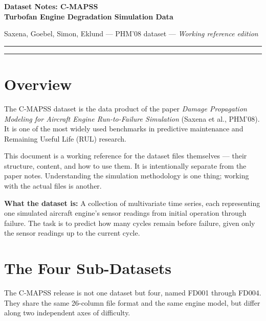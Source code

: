 \documentclass[11pt, a4paper]{article}
\begin{document}

{\Large\bfseries Dataset Notes: C-MAPSS\\
Turbofan Engine Degradation Simulation Data}

\smallskip
{\small Saxena, Goebel, Simon, Eklund \quad --- \quad PHM'08 dataset \quad --- \quad
\textit{Working reference edition}}

\medskip\hrule

\tableofcontents

\bigskip\hrule\bigskip

\section{Overview}

The C-MAPSS dataset is the data product of the paper
\textit{Damage Propagation Modeling for Aircraft Engine
Run-to-Failure Simulation} (Saxena et al., PHM'08).
It is one of the most widely used benchmarks in predictive
maintenance and Remaining Useful Life (RUL) research.

This document is a working reference for the dataset files
themselves --- their structure, content, and how to use them.
It is intentionally separate from the paper notes. Understanding
the simulation methodology is one thing; working with the
actual files is another.

\begin{keybox}
\textbf{What the dataset is:}
A collection of multivariate time series, each representing
one simulated aircraft engine's sensor readings from initial
operation through failure. The task is to predict how many
cycles remain before failure, given only the sensor readings
up to the current cycle.
\end{keybox}

\section{The Four Sub-Datasets}

The C-MAPSS release is not one dataset but four, named
FD001 through FD004. They share the same 26-column file
format and the same engine model, but differ along two
independent axes of difficulty.
\end{document}
